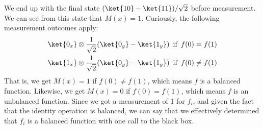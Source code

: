 \documentclass[11pt, notitlepage]{report}
\begin{document}
We end up with the final state $(\ket{10} - \ket{11})/\sqrt2$ before measurement. We can see from this state that $M(x) = 1$. Curiously, the following measurement outcomes apply:
\begin{equation}
\begin{aligned}
\ket{0_x} \otimes \dfrac{1}{\sqrt2}(\ket{0_y} - \ket{1_y}) & \, \text{ if } \, f(0) = f(1) \\
\ket{1_x} \otimes \dfrac{1}{\sqrt2}(\ket{0_y} - \ket{1_y}) & \, \text{ if } \, f(0) \not= f(1)
\end{aligned}
\end{equation}
That is, we get $M(x) = 1$ if $f(0) \not= f(1)$, which means $f$ is a balanced function. Likewise, we get $M(x) = 0$ if $f(0) = f(1)$, which means $f$ is an unbalanced function. Since we got a measurement of 1 for $f_i$, and given the fact that the identity operation is balanced, we can say that we effectively determined that $f_i$ is a balanced function with one call to the black box.
\end{document}
